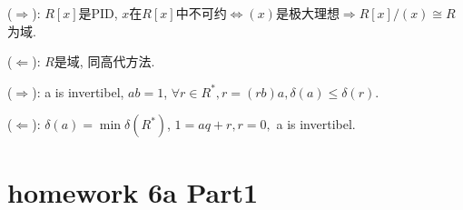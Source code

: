 \documentclass{report}
\begin{document}

\sol
{

    ($\Rightarrow$): $R[x]$是PID, $x$在$R[x]$中不可约$\iff (x)$是极大理想$\Rightarrow R[x]/(x) \cong R$为域. 

    ($\Leftarrow$): $R$是域, 同高代方法.
    
}


\sol
{

    ($\Rightarrow$): a is invertibel, $ab=1$, $\forall r\in R^*, r=(rb)a, \delta(a) \leq \delta (r)$.

    ($\Leftarrow$): $ \delta(a)= \min \delta(R^*)$, $1=aq+r, r=0, $ a is invertibel. 
}

\section{homework 6a Part1}
\end{document}
